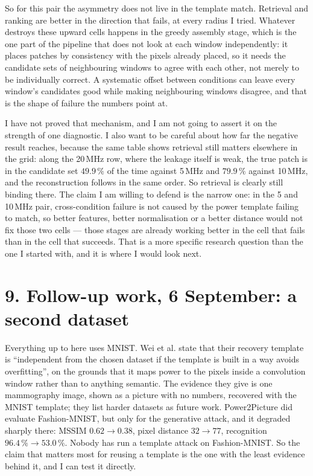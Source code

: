 \documentclass[11pt,a4paper]{article}
\begin{document}
So for this pair the asymmetry does not live in the template match. Retrieval and ranking
are better in the direction that fails, at every radius I tried. Whatever destroys these
upward cells happens in the greedy assembly stage, which is the one part of the pipeline
that does not look at each window independently: it places patches by consistency with the
pixels already placed, so it needs the candidate sets of neighbouring windows to agree with
each other, not merely to be individually correct. A systematic offset between conditions
can leave every window's candidates good while making neighbouring windows disagree, and
that is the shape of failure the numbers point at.

I have not proved that mechanism, and I am not going to assert it on the strength of one
diagnostic. I also want to be careful about how far the negative result reaches, because
the same table shows retrieval still matters elsewhere in the grid: along the 20\,MHz row,
where the leakage itself is weak, the true patch is in the candidate set $49.9\,\%$ of the
time against 5\,MHz and $79.9\,\%$ against 10\,MHz, and the reconstruction follows in the
same order. So retrieval is clearly still binding there. The claim I am willing to defend
is the narrow one: in the 5 and 10\,MHz pair, cross-condition failure is not caused by the
power template failing to match, so better features, better normalisation or a better
distance would not fix those two cells --- those stages are already working better in the
cell that fails than in the cell that succeeds. That is a more specific research question
than the one I started with, and it is where I would look next.


\section*{9. Follow-up work, 6 September: a second dataset}

Everything up to here uses MNIST. Wei et al. state that their recovery template is
``independent from the chosen dataset if the template is built in a way avoids
overfitting'', on the grounds that it maps power to the pixels inside a convolution
window rather than to anything semantic. The evidence they give is one mammography
image, shown as a picture with no numbers, recovered with the MNIST template; they list
harder datasets as future work. Power2Picture did evaluate Fashion-MNIST, but only for
the generative attack, and it degraded sharply there: MSSIM $0.62 \to 0.38$, pixel
distance $32 \to 77$, recognition $96.4\,\% \to 53.0\,\%$. Nobody has run a template
attack on Fashion-MNIST. So the claim that matters most for reusing a template is the
one with the least evidence behind it, and I can test it directly.
\end{document}
